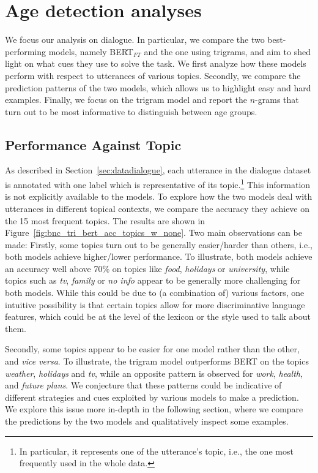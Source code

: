 \section{Age detection analyses}

We focus our analysis on dialogue. In particular, we compare the two best-performing models, namely BERT$_{FT}$
and the one using trigrams, and aim to shed light on  what cues they use to solve the task.
We first analyze how these models perform with respect to utterances of various topics.
Secondly, we compare the prediction patterns of the two models, which allows us to highlight easy and hard examples.
Finally, we focus on the trigram model and report the $n$-grams that turn out to be most informative to distinguish between age groups.


\subsection{Performance Against Topic}

As described in Section~\ref{sec:datadialogue}, each utterance in the dialogue dataset is annotated with one label which is representative of its topic.\footnote{In particular, it represents one of the utterance's topic, i.e., the one most frequently used in the whole data.} This information is not explicitly available to the models.
To explore how the two models deal with utterances in different topical contexts, we compare the accuracy they achieve on the 15 most frequent topics. The results are shown in Figure~\ref{fig:bnc_tri_bert_acc_topics_w_none}. Two main observations can be made: Firstly, some topics turn out to be generally easier/harder than others, i.e., both models achieve higher/lower performance. To illustrate, both models achieve an accuracy well above 70\% on topics like \emph{food}, \emph{holidays} or \emph{university}, while topics such as \emph{tv}, \emph{family} or \emph{no info} appear to be generally more challenging for both models. While this could be due to (a combination of) various factors, one intuitive possibility is that certain topics allow for more discriminative language features, which could be at the level of the lexicon or the style used to talk about them.

Secondly, some topics appear to be easier for one model rather than the other, and \emph{vice versa}. To illustrate, the trigram model outperforms BERT on the topics \emph{weather}, \emph{holidays} and \emph{tv}, while an opposite pattern is observed for \emph{work}, \emph{health}, and \emph{future plans}. We conjecture that these patterns could be indicative of different strategies and cues exploited by various models to make a prediction. We explore this issue more in-depth in the following section, where we compare the predictions by the two models and qualitatively inspect some examples.

